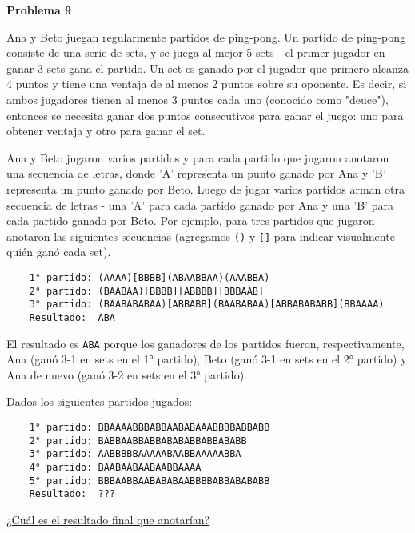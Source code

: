\begin{center}
\Large \textbf{Problema 9}
\end{center}

Ana y Beto juegan regularmente partidos de ping-pong.
Un partido de ping-pong consiste de una serie de sets, y se juega al mejor 5 sets - el primer jugador en ganar 3 sets gana el partido.
Un set es ganado por el jugador que primero alcanza 4 puntos y tiene una ventaja de al menos 2 puntos sobre su oponente.
Es decir, si ambos jugadores tienen al menos 3 puntos cada uno (conocido como "deuce"), entonces se necesita ganar dos puntos consecutivos para ganar el juego:
uno para obtener ventaja y otro para ganar el set.

\bigskip
Ana y Beto jugaron varios partidos y para cada partido que jugaron anotaron una secuencia de letras, donde 'A' representa un punto ganado por Ana y 'B'
representa un punto ganado por Beto. Luego de jugar varios partidos arman otra secuencia de letras - una 'A' para cada partido ganado por Ana y una 'B' para
cada partido ganado por Beto. Por ejemplo, para tres partidos que jugaron anotaron las siguientes secuencias (agregamos \texttt{()} y \texttt{[]} para indicar
visualmente quién ganó cada set).

\begin{verbatim}
    1° partido: (AAAA)[BBBB](ABAABBAA)(AAABBA)
    2° partido: (BAABAA)[BBBB][ABBBB][BBBAAB]
    3° partido: (BAABABABAA)[ABBABB](BAABABAA)[ABBABABABB](BBAAAA)
    Resultado:  ABA
\end{verbatim}

El resultado es \texttt{ABA} porque los ganadores de los partidos fueron, respectivamente, Ana (ganó 3-1 en sets en el 1° partido),
Beto (ganó 3-1 en sets en el 2° partido) y Ana de nuevo (ganó 3-2 en sets en el 3° partido).

\bigskip

Dados los siguientes partidos jugados:
\begin{verbatim}
    1° partido: BBAAAABBBABBAABABAAABBBBABBABB
    2° partido: BABBAABBABBABABABBABBABABB
    3° partido: AABBBBBAAAAABAABBAAAAABBA
    4° partido: BAABAABAABAABBAAAA
    5° partido: BBBAABBAABABABAABBBBABBABABABB
    Resultado:  ???
\end{verbatim}

\underline{¿Cuál es el resultado final que anotarían?}



